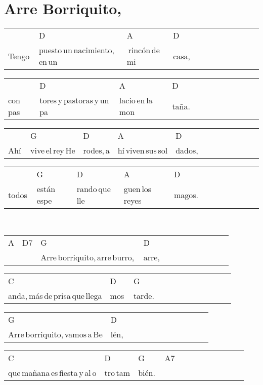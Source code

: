 \section*{Arre Borriquito, \hfill}
\begin{multicols}{2}
\noindent
\begin{minipage}{\columnwidth}
\noindent
\noindent
\begin{tabular}{llllllllllll}
&D&A&D\\
Tengo\,&puesto\,un\,nacimiento,\,en\,un\,&\,rincón\,de\,mi\,&casa,
\end{tabular}

\noindent
\begin{tabular}{llllllllllll}
&D&A&D\\
con\,pas&tores\,y\,pastoras\,y\,un\,pa&lacio\,en\,la\,mon&taña.
\end{tabular}

\noindent
\begin{tabular}{llllllllllll}
&G&D&A&D\\
Ahí\,&vive\,el\,rey\,He&rodes,\,a&hí\,viven\,sus\,sol&dados,
\end{tabular}

\noindent
\begin{tabular}{llllllllllll}
&G&D&A&D\\
todos\,&están\,espe&rando\,que\,lle&guen\,los\,reyes\,&magos.
\end{tabular}
\end{minipage}\\

\noindent
\begin{minipage}{\columnwidth}
\noindent
\noindent
\begin{tabular}{llllllllllll}
A&D7&G&D\\
\quad\,\,\,&\quad\quad\,\,&Arre\,borriquito,\,arre\,burro,\,&arre,
\end{tabular}

\noindent
\begin{tabular}{llllllllllll}
C&D&G\\
anda,\,más\,de\,prisa\,que\,llega&mos\,&tarde.
\end{tabular}

\noindent
\begin{tabular}{llllllllllll}
G&D\\
Arre\,borriquito,\,vamos\,a\,Be&lén,
\end{tabular}

\noindent
\begin{tabular}{llllllllllll}
C&D&G&A7\\
que\,mañana\,es\,fiesta\,y\,al\,o&tro\,tam&bién.\,&
\end{tabular}
\end{minipage}\\


\end{multicols}
